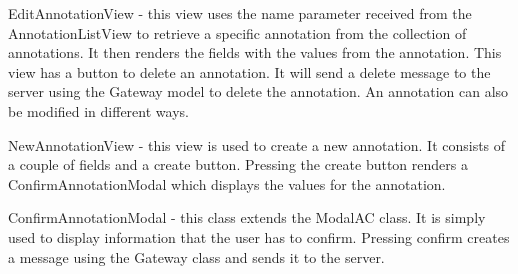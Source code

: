 EditAnnotationView - this view uses the name parameter received from the AnnotationListView to retrieve a specific annotation from the collection of annotations. It then renders the fields with the values from the annotation. This view has a button to delete an annotation. It will send a delete message to the server using the Gateway model to delete the annotation. An annotation can also be modified in different ways.

NewAnnotationView - this view is used to create a new annotation. It consists of a couple of fields and a create button. Pressing the create button renders a ConfirmAnnotationModal which displays the values for the annotation.

ConfirmAnnotationModal - this class extends the ModalAC class. It is simply used to display information that the user has to confirm. Pressing confirm creates a message using the Gateway class and sends it to the server.
